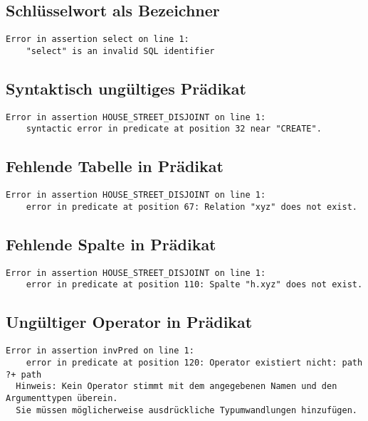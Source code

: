 \documentclass[a4paper]{article}
\begin{document}
\subsection{Schlüsselwort als Bezeichner}


\begin{verbatim}
Error in assertion select on line 1: 
    "select" is an invalid SQL identifier
\end{verbatim}

\subsection{Syntaktisch ungültiges Prädikat}


\begin{verbatim}
Error in assertion HOUSE_STREET_DISJOINT on line 1: 
    syntactic error in predicate at position 32 near "CREATE".
\end{verbatim}

\subsection{Fehlende Tabelle in Prädikat}


\begin{verbatim}
Error in assertion HOUSE_STREET_DISJOINT on line 1: 
    error in predicate at position 67: Relation "xyz" does not exist.
\end{verbatim}

\subsection{Fehlende Spalte in Prädikat}


\begin{verbatim}
Error in assertion HOUSE_STREET_DISJOINT on line 1: 
    error in predicate at position 110: Spalte "h.xyz" does not exist.
\end{verbatim}

\subsection{Ungültiger Operator in Prädikat}


\begin{verbatim}
Error in assertion invPred on line 1: 
    error in predicate at position 120: Operator existiert nicht: path ?+ path
  Hinweis: Kein Operator stimmt mit dem angegebenen Namen und den Argumenttypen überein.
  Sie müssen möglicherweise ausdrückliche Typumwandlungen hinzufügen.
\end{verbatim}
\end{document}
